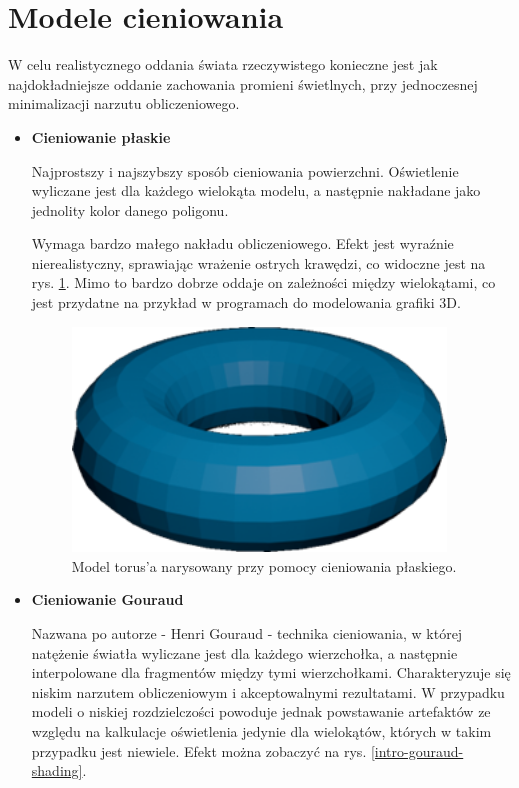 \section{Modele cieniowania}

W celu realistycznego oddania świata rzeczywistego konieczne jest jak najdokładniejsze oddanie zachowania promieni świetlnych, przy jednoczesnej minimalizacji narzutu obliczeniowego. 

\begin{itemize}
	\item \textbf{Cieniowanie płaskie}

	Najprostszy i najszybszy sposób cieniowania powierzchni. Oświetlenie wyliczane jest dla każdego wielokąta modelu, a następnie nakładane jako jednolity kolor danego poligonu.
	
	Wymaga bardzo małego nakładu obliczeniowego. Efekt jest wyraźnie nierealistyczny, sprawiając wrażenie ostrych krawędzi, co widoczne jest na rys. \ref{intro-flat-shading}. Mimo to bardzo dobrze oddaje on zależności między wielokątami, co jest przydatne na przykład w programach do modelowania grafiki 3D.

	\begin{figure}[htbp]
		\centering
		\includegraphics[width=3.90833in,height=2.34916in]{images/3_flat_shading_torus.png}
		\caption{Model torus'a narysowany przy pomocy cieniowania płaskiego.}
		\label{intro-flat-shading}
	\end{figure}

	\item \textbf{Cieniowanie Gouraud}
	
	Nazwana po autorze - Henri Gouraud - technika cieniowania, w której natężenie światła wyliczane jest dla każdego wierzchołka, a następnie interpolowane dla fragmentów między tymi wierzchołkami. Charakteryzuje się niskim narzutem obliczeniowym i akceptowalnymi rezultatami. W przypadku modeli o niskiej rozdzielczości powoduje jednak powstawanie artefaktów ze względu na kalkulacje oświetlenia jedynie dla wielokątów, których w takim przypadku jest niewiele. Efekt można zobaczyć na rys. \ref{intro-gouraud-shading}.


\end{itemize}
